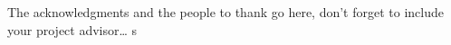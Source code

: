 \documentclass[
12pt, %
oneside, %
english, %
onehalfspacing, %
headsepline, %
]{Structural} %
\begin{document}

\begin{acknowledgements}
\addchaptertocentry{\acknowledgementname} %
The acknowledgments and the people to thank go here, don't forget to include your project advisor\ldots
s 

\end{acknowledgements}


\tableofcontents %

\listoffigures %









\end{document}
